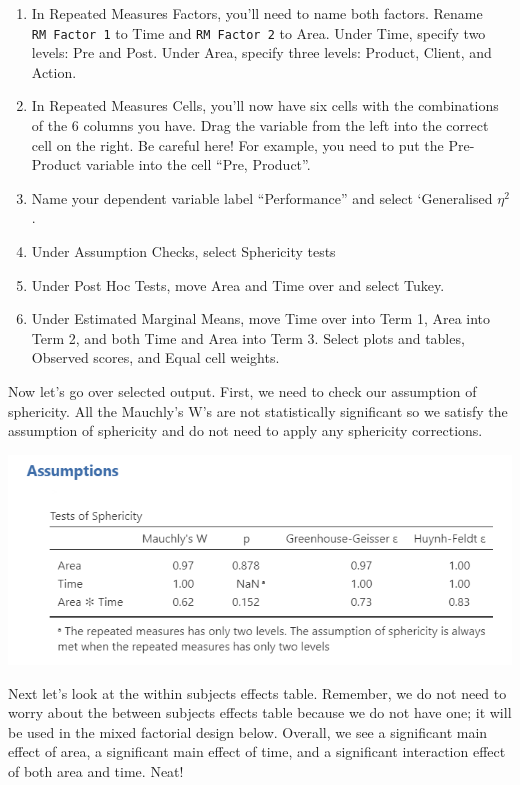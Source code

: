 \documentclass[
]{book}
\begin{document}
\begin{enumerate}
\def\labelenumi{\arabic{enumi}.}
\item
  In Repeated Measures Factors, you'll need to name both factors. Rename \texttt{RM\ Factor\ 1} to Time and \texttt{RM\ Factor\ 2} to Area. Under Time, specify two levels: Pre and Post. Under Area, specify three levels: Product, Client, and Action.
\item
  In Repeated Measures Cells, you'll now have six cells with the combinations of the 6 columns you have. Drag the variable from the left into the correct cell on the right. Be careful here! For example, you need to put the Pre-Product variable into the cell ``Pre, Product''.
\item
  Name your dependent variable label ``Performance'' and select `Generalised \(\eta^2\).
\item
  Under Assumption Checks, select Sphericity tests
\item
  Under Post Hoc Tests, move Area and Time over and select Tukey.
\item
  Under Estimated Marginal Means, move Time over into Term 1, Area into Term 2, and both Time and Area into Term 3. Select plots and tables, Observed scores, and Equal cell weights.
\end{enumerate}

Now let's go over selected output. First, we need to check our assumption of sphericity. All the Mauchly's W's are not statistically significant so we satisfy the assumption of sphericity and do not need to apply any sphericity corrections.

\includegraphics{images/06-factorial-anova/rm-factorial_assumption.png}

Next let's look at the within subjects effects table. Remember, we do not need to worry about the between subjects effects table because we do not have one; it will be used in the mixed factorial design below. Overall, we see a significant main effect of area, a significant main effect of time, and a significant interaction effect of both area and time. Neat!
\end{document}
